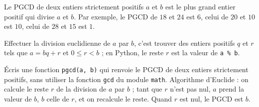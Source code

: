 Le PGCD de deux entiers strictement positifs $a$ et $b$ est le plus grand entier positif qui divise $a$ et $b$. Par exemple, le PGCD de $18$ et $24$ est $6$, celui de $20$ et $10$ est $10$, celui de $28$ et $15$ est $1$.

Effectuer la division euclidienne de $a$ par $b$, c'est trouver des entiers positifs $q$ et $r$ tels que $a = bq + r$ et $0 \le r < b$ ; en Python, le reste $r$ est la valeur de \texttt{a \% b}.

Écris une fonction \texttt{pgcd(a, b)} qui renvoie le PGCD de deux entiers strictement positifs, sans utiliser la fonction \texttt{gcd} du module \texttt{math}. Algorithme d'Euclide : on calcule le reste $r$ de la division de $a$ par $b$ ; tant que $r$ n'est pas nul, $a$ prend la valeur de $b$, $b$ celle de $r$, et on recalcule le reste. Quand $r$ est nul, le PGCD est $b$.
